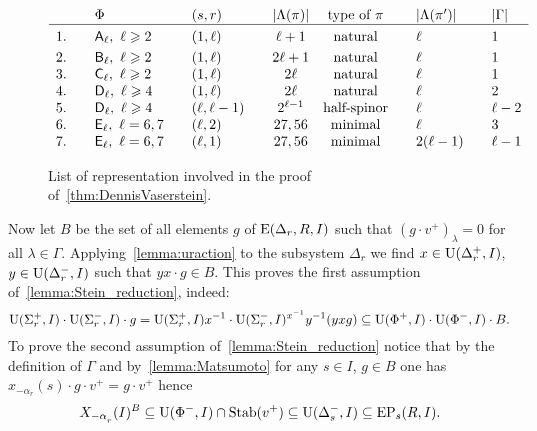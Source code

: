 \begin{figure}
\[\begin{array}{l @{\qquad} l @{\qquad} l @{\qquad} c @{\quad} c @{\qquad} l @{\qquad} l}
   & \Phi                                 & (s,r)         & |\Lambda(\pi)| & \text{type of $\pi$} & |\Lambda(\pi')|& |\Gamma|  \\ \hline\vphantom{\Bigl(}
1. & \rA_\ell,\ \ell\geqslant 2           & (1,\ell)      & \ell+1         & \text{natural}       & \ell           & 1  \\     
2. & \rB_\ell,\ \ell\geqslant 2           & (1,\ell)      & 2\ell+1        & \text{natural}       & \ell           & 1  \\     
3. & \rC_\ell,\ \ell\geqslant 2           & (1,\ell)      & 2\ell          & \text{natural}       & \ell           & 1  \\
4. & \rD_\ell,\ \ell\geqslant 4           & (1,\ell)      & 2\ell          & \text{natural}       & \ell           & 2  \\ 
5. & \rD_\ell,\ \ell\geqslant 4           & (\ell,\ell-1) & 2^{\ell-1}     & \text{half-spinor}   & \ell           & \ell-2  \\
6. & \rE_\ell,\ \ell=6,7                  & (\ell,2)      & 27, 56         & \text{minimal}       & \ell           & 3       \\ 
7. & \rE_\ell,\ \ell=6,7                  & (\ell,1)      & 27, 56         & \text{minimal}       & 2(\ell-1)      & \ell-1  \end{array}\]
 \caption[Table]{List of representation involved in the proof of~\cref{thm:DennisVaserstein}.} \label{fig:table}
\end{figure}

Now let $B$ be the set of all elements $g$ of $\operatorname{E}(\Delta_r,R, I)$ such that $(g \cdot v^+)_\lambda = 0$ for all $\lambda\in\Gamma$.
Applying~\cref{lemma:uraction} to the subsystem $\Delta_r$ we find
$x\in\operatorname{U}(\Delta_r^+, I)$, $y\in \operatorname{U}(\Delta_r^-, I)$ such that $yx\cdot g \in B$.
This proves the first assumption of~\cref{lemma:Stein_reduction}, indeed:
\[ \operatorname{U}(\Sigma^+_r, I) \cdot \operatorname{U}(\Sigma^-_r, I) \cdot g = \operatorname{U}(\Sigma^+_r, I) x^{-1} \cdot \operatorname{U}(\Sigma^-_r, I)^{x^{-1}} y^{-1} (yxg) \subseteq \operatorname{U}(\Phi^+, I) \cdot \operatorname{U}(\Phi^-, I) \cdot B. \]
To prove the second assumption of~\cref{lemma:Stein_reduction} notice that by the definition of $\Gamma$ and by~\cref{lemma:Matsumoto} for any $s\in I$, $ g\in B$ one has $x_{-\alpha_r}(s) \cdot g \cdot v^+ = g \cdot v^+$ hence
\[ X_{-\alpha\ssub{r}}(I)^{B} \subseteq \U(\Phi^-, I) \cap \Stab(v^+) \subseteq \U(\Delta_s^-, I) \subseteq \EP_s(R, I). \]

